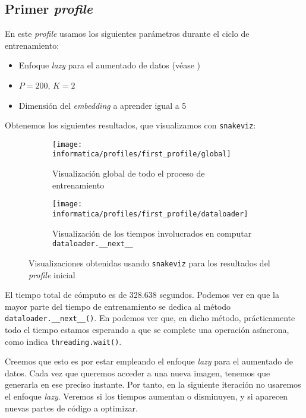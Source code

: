 \subsection{Primer \textit{profile}}

En este \textit{profile} usamos los siguientes parámetros durante el ciclo de entrenamiento:

\begin{itemize}
    \item Enfoque \textit{lazy} para el aumentado de datos (véase )
    \item $P = 200$, $K = 2$
    \item Dimensión del \textit{embedding} a aprender igual a 5
\end{itemize}

Obtenemos los siguientes resultados, que visualizamos con \lstinline{snakeviz}:

\begin{figure}[H]
\centering
\ajustarsubcaptions

    \begin{subfigure}{.5\textwidth}
        \centering
        \texttt{[image: informatica/profiles/first\_profile/global]}
        \caption{Visualización global de todo el proceso de entrenamiento}
        \label{img:first_profile_global}
    \end{subfigure}%
    \begin{subfigure}{.5\textwidth}
        \centering
        \texttt{[image: informatica/profiles/first\_profile/dataloader]}
        \caption{Visualización de los tiempos involucrados en computar \lstinline{dataloader.__next__}}
        \label{img:first_profile_dataloader_next}
    \end{subfigure}
\caption{Visualizaciones obtenidas usando \lstinline{snakeviz} para los resultados del \textit{profile} inicial}
\end{figure}

El tiempo total de cómputo es de 328.638 segundos. Podemos ver en  que la mayor parte del tiempo de entrenamiento se dedica al método \lstinline{dataloader.__next__()}. En  podemos ver que, en dicho método, prácticamente todo el tiempo estamos esperando a que se complete una operación asíncrona, como indica \lstinline{threading.wait()}.

Creemos que esto es por estar empleando el enfoque \textit{lazy} para el aumentado de datos. Cada vez que queremos acceder a una nueva imagen, tenemos que generarla en ese preciso instante. Por tanto, en la siguiente iteración no usaremos el enfoque \textit{lazy}. Veremos si los tiempos aumentan o disminuyen, y si aparecen nuevas partes de código a optimizar.

